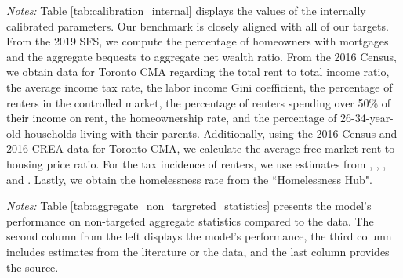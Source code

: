 \documentclass[parskip=full]{article}
\newenvironment{fignote2}[1]
{
\par
\medskip
\begin{minipage}{#1}
\footnotesize
}
{
\end{minipage}
}
\begin{document}
\begin{table}[H]
    \centering
    \caption{Internally assigned parameter values}
    \vspace{-1.25cm}
    \label{tab:calibration_internal}
    
    \vspace{-0.5cm}
    \begin{fignote2}{1.08\textwidth}
    \textit{Notes:} Table \ref{tab:calibration_internal} displays the values of the internally calibrated parameters. Our benchmark is closely aligned with all of our targets. From the 2019 SFS, we compute the percentage of homeowners with mortgages and the aggregate bequests to aggregate net wealth ratio. From the 2016 Census, we obtain data for Toronto CMA regarding the total rent to total income ratio, the average income tax rate, the labor income Gini coefficient, the percentage of renters in the controlled market, the percentage of renters spending over 50\% of their income on rent, the homeownership rate, and the percentage of 26-34-year-old households living with their parents. Additionally, using the 2016 Census and 2016 CREA data for Toronto CMA, we calculate the average free-market rent to housing price ratio. For the tax incidence of renters, we use estimates from \citet{cy-1994}, \citet{susin-2002}, \citet{fack-2006}, and \citet{sy-2020}. Lastly, we obtain the homelessness rate from the ``Homelessness Hub".
    \end{fignote2}
\end{table}

\begin{table}[H]
    \centering
    \caption{Aggregate non-targeted statistics}
    \vspace{-0.5cm}
    \label{tab:aggregate_non_targreted_statistics}  
    \vspace{-0.45cm}
    \begin{fignote2}{0.84\textwidth}
      \textit{Notes:} Table \ref{tab:aggregate_non_targreted_statistics} presents the model's performance on non-targeted aggregate statistics compared to the data. The second column from the left displays the model's performance, the third column includes estimates from the literature or the data, and the last column provides the source.
    \end{fignote2}
\end{table}
\end{document}
